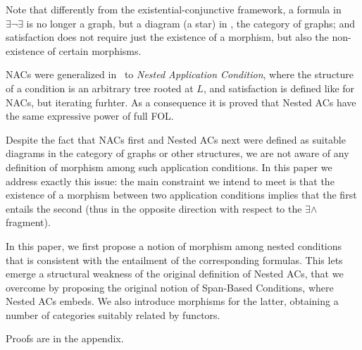 Note that differently from the existential-conjunctive framework, a formula in $\exists \neg \exists$ is no longer a graph, but a diagram (a star) in , the category of graphs; and satisfaction does not require just the existence of a morphism, but also the non-existence of certain morphisms.

NACs were generalized in~\cite{Rensink-FOL,Habel-FOL} to \emph{Nested Application Condition}, where the structure of a condition is an arbitrary tree rooted at $L$, and satisfaction is defined like for NACs, but iterating furhter. As a consequence it is proved that Nested ACs have the same expressive power of full FOL.

Despite the fact that NACs first and Nested ACs next were defined as suitable diagrams in the category of graphs or other structures, we are not aware of any definition of morphism among such application conditions. In this paper we address exactly this issue: the main constraint we intend to meet is that the existence of a morphism between two application conditions implies that the first entails the second (thus in the opposite direction with respect to the $\exists\wedge$ fragment).
 
\medskip\noindent
In this paper, we first propose a notion of morphism among nested conditions that is consistent with the entailment of the corresponding formulas. This lets emerge
a structural weakness of the original definition of Nested ACs, that we overcome by proposing the original notion of Span-Based Conditions, where Nested ACs embeds. We also introduce morphisms for the latter, obtaining a number of categories suitably related by functors. 

Proofs are in the appendix.
 
 